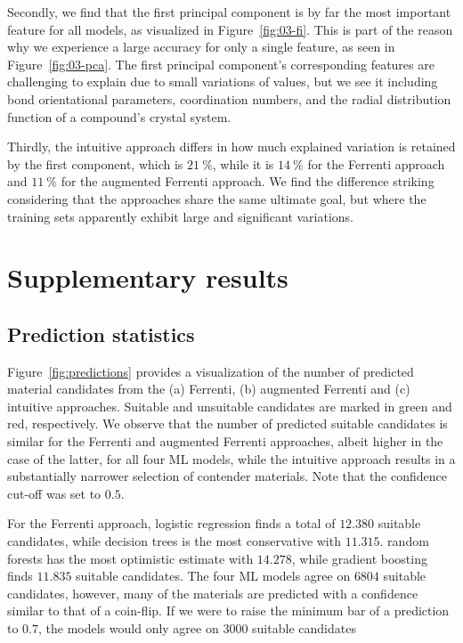 \documentclass[superscriptaddress,unsortedaddress,
 amsmath,amssymb,
 aps,
]{revtex4-2}
\begin{document}
Secondly, we find that the first principal component is by far the most important feature for all models, as visualized in Figure~\ref{fig:03-fi}. This is part of the reason why we experience a large accuracy for only a single feature, as seen in Figure~\ref{fig:03-pca}. The first principal component's corresponding features are challenging to explain due to small variations of values, but we see it including 
bond orientational parameters, coordination numbers, and the radial distribution function of a compound's crystal system.

Thirdly, the intuitive approach differs in how much explained variation is retained by the first component, which is $21 \ \%$, while it is $14 \ \%$ for the Ferrenti approach and $11 \ \%$ for the augmented Ferrenti approach. We find the difference striking considering that the approaches share the same ultimate goal, but where the training sets apparently exhibit large and significant variations. 



\section*{Supplementary results} 

\subsection*{Prediction statistics}

Figure~\ref{fig:predictions} provides a visualization of the number of predicted material candidates from the (a) Ferrenti, (b) augmented Ferrenti and (c) intuitive approaches. Suitable and unsuitable candidates are marked in green and red, respectively. We observe that the number of predicted suitable candidates is similar for the Ferrenti and augmented Ferrenti approaches, albeit higher in the case of the latter, for all four ML models, while the intuitive approach results in a substantially narrower selection of contender materials. Note that the confidence cut-off was set to $0.5$. 

For the Ferrenti approach, logistic regression finds a total of $12.380$ suitable candidates, while decision trees is the most conservative with $11.315$. random forests has the most optimistic estimate with $14.278$, while gradient boosting finds $11.835$ suitable candidates. The four ML models agree on $6804$ suitable candidates, however, many of the materials
are predicted with a confidence similar to that of a coin-flip.
If we were to raise the minimum bar of a prediction to
$0.7$, the models would only agree on $3000$ suitable candidates
\end{document}
